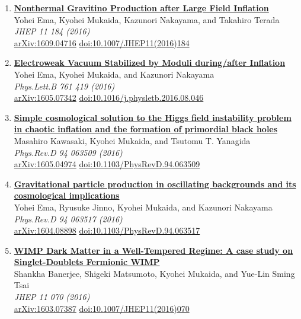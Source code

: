 \begin{enumerate}
\item \textbf{\href{https://arxiv.org/abs/1609.04716}{Nonthermal Gravitino Production after Large Field Inflation}}\\
Yohei Ema, Kyohei Mukaida, Kazunori Nakayama, and Takahiro Terada\\
\emph{JHEP 11 184 (2016)}
\\ \href{https://arxiv.org/abs/1609.04716}{arXiv:1609.04716} \href{https://doi.org/10.1007/JHEP11(2016)184}{doi:10.1007/JHEP11(2016)184}

\item \textbf{\href{https://arxiv.org/abs/1605.07342}{Electroweak Vacuum Stabilized by Moduli during/after Inflation}}\\
Yohei Ema, Kyohei Mukaida, and Kazunori Nakayama\\
\emph{Phys.Lett.B 761 419 (2016)}
\\ \href{https://arxiv.org/abs/1605.07342}{arXiv:1605.07342} \href{https://doi.org/10.1016/j.physletb.2016.08.046}{doi:10.1016/j.physletb.2016.08.046}

\item \textbf{\href{https://arxiv.org/abs/1605.04974}{Simple cosmological solution to the Higgs field instability problem in chaotic inflation and the formation of primordial black holes}}\\
Masahiro Kawasaki, Kyohei Mukaida, and Tsutomu T. Yanagida\\
\emph{Phys.Rev.D 94 063509 (2016)}
\\ \href{https://arxiv.org/abs/1605.04974}{arXiv:1605.04974} \href{https://doi.org/10.1103/PhysRevD.94.063509}{doi:10.1103/PhysRevD.94.063509}

\item \textbf{\href{https://arxiv.org/abs/1604.08898}{Gravitational particle production in oscillating backgrounds and its cosmological implications}}\\
Yohei Ema, Ryusuke Jinno, Kyohei Mukaida, and Kazunori Nakayama\\
\emph{Phys.Rev.D 94 063517 (2016)}
\\ \href{https://arxiv.org/abs/1604.08898}{arXiv:1604.08898} \href{https://doi.org/10.1103/PhysRevD.94.063517}{doi:10.1103/PhysRevD.94.063517}

\item \textbf{\href{https://arxiv.org/abs/1603.07387}{WIMP Dark Matter in a Well-Tempered Regime: A case study on Singlet-Doublets Fermionic WIMP}}\\
Shankha Banerjee, Shigeki Matsumoto, Kyohei Mukaida, and Yue-Lin Sming Tsai\\
\emph{JHEP 11 070 (2016)}
\\ \href{https://arxiv.org/abs/1603.07387}{arXiv:1603.07387} \href{https://doi.org/10.1007/JHEP11(2016)070}{doi:10.1007/JHEP11(2016)070}


\end{enumerate}
